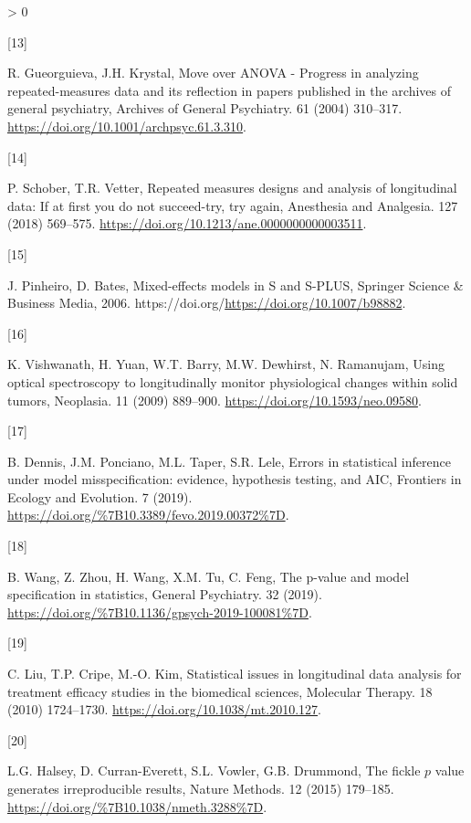 \documentclass[
]{article}
\newlength{\cslhangindent}
\newlength{\csllabelwidth}
\newenvironment{CSLReferences}[2] %
 {%
  \setlength{\parindent}{0pt}
  \ifodd #1 \everypar{\setlength{\hangindent}{\cslhangindent}}\ignorespaces\fi
  \ifnum #2 > 0
  \setlength{\parskip}{#2\baselineskip}
  \fi
 }%
 {}
\newcommand{\CSLLeftMargin}[1]{\parbox[t]{\csllabelwidth}{#1}}
\newcommand{\CSLRightInline}[1]{\parbox[t]{\linewidth - \csllabelwidth}{#1}\break}
\begin{document}
\begin{CSLReferences}{0}{0}
\leavevmode\hypertarget{ref-gueorguieva2004}{}%
\CSLLeftMargin{{[}13{]} }
\CSLRightInline{R. Gueorguieva, J.H. Krystal, {Move over ANOVA - Progress in analyzing repeated-measures data and its reflection in papers published in the archives of general psychiatry}, Archives of General Psychiatry. 61 (2004) 310--317. \url{https://doi.org/10.1001/archpsyc.61.3.310}.}

\leavevmode\hypertarget{ref-schober2018}{}%
\CSLLeftMargin{{[}14{]} }
\CSLRightInline{P. Schober, T.R. Vetter, Repeated measures designs and analysis of longitudinal data: If at first you do not succeed-try, try again, Anesthesia and Analgesia. 127 (2018) 569--575. \url{https://doi.org/10.1213/ane.0000000000003511}.}

\leavevmode\hypertarget{ref-pinheiro2006}{}%
\CSLLeftMargin{{[}15{]} }
\CSLRightInline{J. Pinheiro, D. Bates, {Mixed-effects models in S and S-PLUS}, Springer Science \& Business Media, 2006. https://doi.org/\url{https://doi.org/10.1007/b98882}.}

\leavevmode\hypertarget{ref-vishwanath2009}{}%
\CSLLeftMargin{{[}16{]} }
\CSLRightInline{K. Vishwanath, H. Yuan, W.T. Barry, M.W. Dewhirst, N. Ramanujam, Using optical spectroscopy to longitudinally monitor physiological changes within solid tumors, Neoplasia. 11 (2009) 889--900. \url{https://doi.org/10.1593/neo.09580}.}

\leavevmode\hypertarget{ref-dennis2019}{}%
\CSLLeftMargin{{[}17{]} }
\CSLRightInline{B. Dennis, J.M. Ponciano, M.L. Taper, S.R. Lele, {Errors in statistical inference under model misspecification: evidence, hypothesis testing, and AIC}, {Frontiers in Ecology and Evolution}. {7} (2019). \url{https://doi.org/\%7B10.3389/fevo.2019.00372\%7D}.}

\leavevmode\hypertarget{ref-wang2019}{}%
\CSLLeftMargin{{[}18{]} }
\CSLRightInline{B. Wang, Z. Zhou, H. Wang, X.M. Tu, C. Feng, {The p-value and model specification in statistics}, {General Psychiatry}. {32} (2019). \url{https://doi.org/\%7B10.1136/gpsych-2019-100081\%7D}.}

\leavevmode\hypertarget{ref-liu2010}{}%
\CSLLeftMargin{{[}19{]} }
\CSLRightInline{C. Liu, T.P. Cripe, M.-O. Kim, Statistical issues in longitudinal data analysis for treatment efficacy studies in the biomedical sciences, Molecular Therapy. 18 (2010) 1724--1730. \url{https://doi.org/10.1038/mt.2010.127}.}

\leavevmode\hypertarget{ref-halsey2015}{}%
\CSLLeftMargin{{[}20{]} }
\CSLRightInline{L.G. Halsey, D. Curran-Everett, S.L. Vowler, G.B. Drummond, {The fickle \(p\) value generates irreproducible results}, {Nature Methods}. {12} (2015) 179--185. \url{https://doi.org/\%7B10.1038/nmeth.3288\%7D}.}


\end{CSLReferences}
\end{document}
